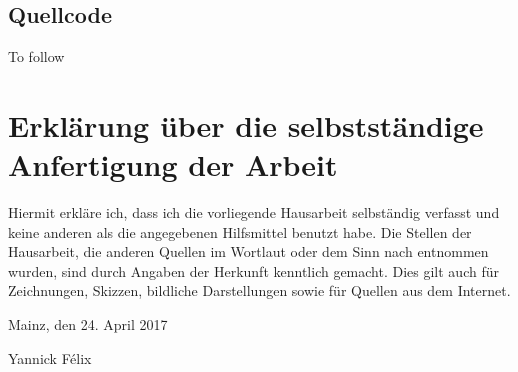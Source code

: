 \documentclass[a4paper,12pt]{scrartcl}      %
\begin{document}
	\subsection{Quellcode}
	To follow
	
	\newpage
	\section{Erklärung über die selbstständige Anfertigung der Arbeit}
	Hiermit erkläre ich, dass ich die vorliegende Hausarbeit selbständig verfasst und keine anderen als die angegebenen Hilfsmittel benutzt habe.
	Die Stellen der Hausarbeit, die anderen Quellen im Wortlaut oder dem Sinn nach entnommen wurden, sind durch Angaben der Herkunft kenntlich gemacht. Dies gilt auch für Zeichnungen, Skizzen, bildliche Darstellungen sowie für Quellen aus dem Internet.\par
	\vspace{0.5cm}
	\noindent Mainz, den 24. April 2017\par
	\vspace{2cm}
	\noindent Yannick F\'{e}lix
	\vfill
	\doclicenseThis
\end{document}

